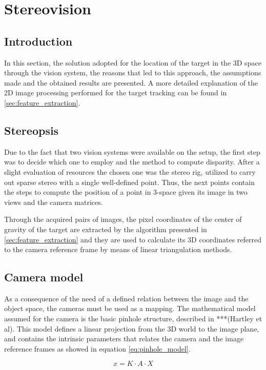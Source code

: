 
\section{Stereovision} %
\label{sec:stereopsis}

\subsection{Introduction}
In this section, the solution adopted for the location of the target in the 3D space through the vision system, the reasons that led to this approach, the assumptions made and the obtained results are presented. 
A more detailed explanation of the 2D image processing performed for the target tracking can be found in \ref{sec:feature_extraction}.

\subsection{Stereopsis}
Due to the fact that two vision systems were available on the setup, the first step was to decide which one to employ and the method to compute disparity. 
After a slight evaluation of resources the chosen one was the stereo rig, utilized to carry out sparse stereo with a single well-defined point. 
Thus, the next points contain the steps to compute the position of a point in 3-space given its image in two views and the camera matrices. 

Through the acquired pairs of images, the pixel coordinates of the center of gravity of the target are extracted by the algorithm presented in \ref{sec:feature_extraction} and they are used to calculate its 3D coordinates referred to the camera reference frame by means of linear triangulation methods.

\subsection{Camera model}
As a consequence of the need of a defined relation between the image and the object space, the cameras must be used as a mapping. 
The mathematical model assumed for the camera is the basic pinhole structure, described in ***(Hartley et al). 
This model defines a linear projection from the 3D world to the image plane, and contains the intrinsic parameters that relates the camera and the image reference frames as showed in equation \ref{eq:pinhole_model}. 

\begin{equation}
x = K·A·X
\label{eq:pinhole_model}
\end{equation}  

